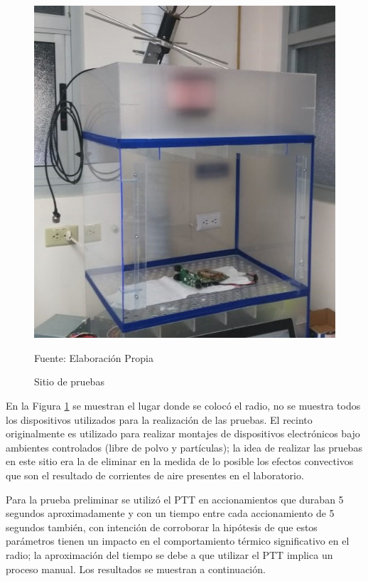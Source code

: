\begin{figure}[H]
\centering
\includegraphics[scale=0.6]{Figuras/campana.jpeg}
\caption{Sitio de pruebas}
Fuente: Elaboración Propia
\label{campana}
\end{figure}


En la Figura \ref{campana} se muestran el lugar donde se colocó el radio, no se muestra todos los dispositivos utilizados para la realización de las pruebas. El recinto originalmente es utilizado para realizar montajes de dispositivos electrónicos bajo ambientes controlados (libre de polvo y partículas); la idea de realizar las pruebas en este sitio era la de eliminar en la medida de lo posible los efectos convectivos que son el resultado de corrientes de aire presentes en el laboratorio.

Para la prueba preliminar se utilizó el PTT en accionamientos que duraban 5 segundos aproximadamente y con un tiempo entre cada accionamiento de 5 segundos también, con intención de corroborar la hipótesis de que estos parámetros tienen un impacto en el comportamiento térmico significativo en el radio; la aproximación del tiempo se debe a que utilizar el PTT implica un proceso manual. Los resultados se muestran a continuación.

